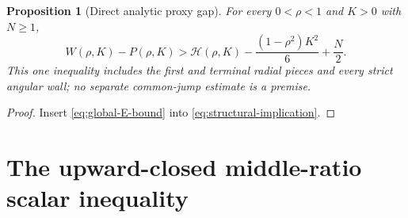 \documentclass[11pt]{article}
\newtheorem{proposition}[lemma]{Proposition}
\theoremstyle{remark}
\begin{document}
\begin{proposition}[Direct analytic proxy gap]
\label{prop:direct-proxy-gap}
For every $0<\rho<1$ and $K>0$ with $N\geq1$,
\begin{equation}
 \boxed{
 W(\rho,K)-P(\rho,K)
 >\mathcal H(\rho,K)
  -\frac{(1-\rho^2)K^2}{6}+\frac N2.}
 \label{eq:direct-proxy-gap}
\end{equation}
This one inequality includes the first and terminal radial pieces and every
strict angular wall; no separate common-jump estimate is a premise.
\end{proposition}

\begin{proof}
Insert \eqref{eq:global-E-bound} into
\eqref{eq:structural-implication}.
\end{proof}

\section{The upward-closed middle-ratio scalar inequality}
\end{document}

